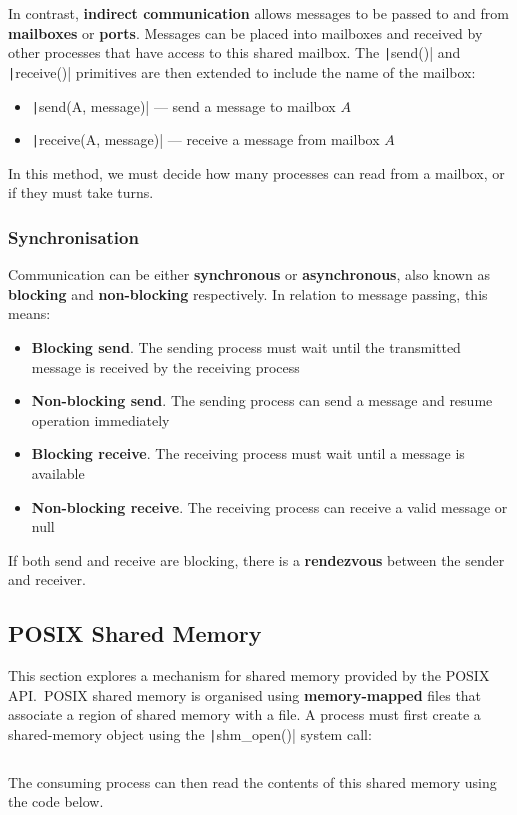 \documentclass{article}
\begin{document}
In contrast, \textbf{indirect communication} allows messages to be
passed to and from \textbf{mailboxes} or \textbf{ports}. Messages can
be placed into mailboxes and received by other processes that have
access to this shared mailbox. The \texttt|send()| and
\texttt|receive()| primitives are then extended to include
the name of the mailbox:
\begin{itemize}
    \item \texttt|send(A, message)| --- send a message to
          mailbox \(A\)
    \item \texttt|receive(A, message)| --- receive a message
          from mailbox \(A\)
\end{itemize}
In this method, we must decide how many processes can read from a
mailbox, or if they must take turns.
\subsubsection{Synchronisation}
Communication can be either \textbf{synchronous} or
\textbf{asynchronous}, also known as \textbf{blocking} and
\textbf{non-blocking} respectively. In relation to message passing,
this means:
\begin{itemize}
    \item \textbf{Blocking send}. The sending process must wait until
          the transmitted message is received by the receiving process
    \item \textbf{Non-blocking send}. The sending process can send a
          message and resume operation immediately
    \item \textbf{Blocking receive}. The receiving process must wait
          until a message is available
    \item \textbf{Non-blocking receive}. The receiving process can
          receive a valid message or null
\end{itemize}
If both send and receive are blocking, there is a \textbf{rendezvous}
between the sender and receiver.
\subsection{POSIX Shared Memory}
This section explores a mechanism for shared memory provided by the
POSIX API.\ POSIX shared memory is organised using
\textbf{memory-mapped} files that associate a region of shared memory
with a file. A process must first create a shared-memory object using
the \texttt|shm_open()| system call:
\inputminted{c}{code/posix_shared_memory_producer.c} The consuming
process can then read the contents of this shared memory using the code
below.\ \inputminted{c}{code/posix_shared_memory_consumer.c}
\end{document}
